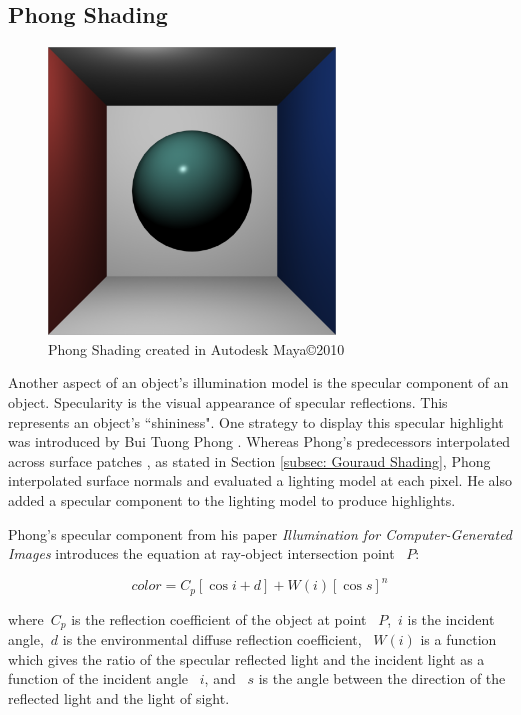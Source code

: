 \subsection{Phong Shading}
\label{subsec:Phong Shading}
\begin{figure}[h]
\centering
\includegraphics[height=3.0in]{figures/phong_Maya.png}
\caption{Phong Shading created in Autodesk Maya\copyright 2010}
\label{fig:phongmaya}
\end{figure}
Another aspect of an object's illumination model is the specular component of an object.  Specularity is the visual appearance of specular reflections.  This represents an object's ``shininess".  One strategy to display this specular highlight was introduced by Bui Tuong Phong \cite{Phong1975}. Whereas Phong's predecessors interpolated across surface patches \cite{gouraud1971}, as stated in Section \ref{subsec: Gouraud Shading}, Phong interpolated surface normals and evaluated a lighting model at each pixel.  He also added a specular component to the lighting model to produce highlights.\cite{lyon1993phong}

Phong's specular component from his paper \textit{Illumination for Computer-Generated Images} introduces the equation at ray-object intersection point ~$P$:

\begin{equation}
\label{eq:Phong01}
color = C_{p}[\cos{i} + d] + W(i)[\cos{s}]^{n}
\end{equation}

where~$C_p$ is the reflection coefficient of the object at point ~$P$,~$i$ is the incident angle,~$d$ is the environmental diffuse reflection coefficient, ~$W(i)$ is a function which gives the ratio of the specular reflected light and the incident light as a function of the incident angle ~$i$, and ~$s$ is the angle between the direction of the reflected light and the light of sight.

